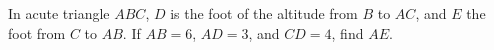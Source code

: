In acute triangle $ABC$, $D$ is the foot of the altitude from $B$ to $AC$, and $E$ the foot from $C$ to $AB$. If $AB=6$, $AD=3$, and $CD=4$, find $AE$.
